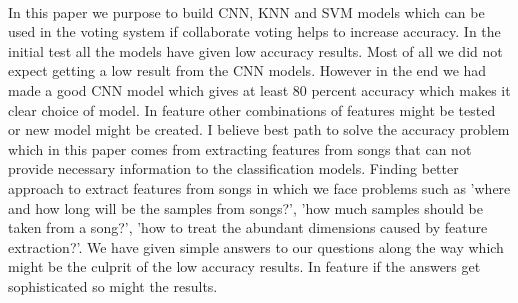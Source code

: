 \documentclass[10pt,twocolumn,letterpaper]{article}
\begin{document}
  \paragraph{}In this paper we purpose to build CNN, KNN and SVM models which can be used in the voting system if collaborate voting helps to increase accuracy. In the initial test all the models have given low accuracy results. Most of all we did not expect getting a low result from the CNN models. However in the end we had made a good CNN model which gives at least 80 percent accuracy which makes it clear choice of model. In feature other combinations of features might be tested or new model might be created. I believe best path to solve the accuracy problem which in this paper comes from extracting features from songs that can not provide necessary information to the classification models. Finding better approach to extract features from songs in which we face problems such as 'where and how long will be the samples from songs?', 'how much samples should be taken from a song?', 'how to treat the abundant dimensions caused by feature extraction?'. We have given simple answers to our questions along the way which might be the culprit of the low accuracy results. In feature if the answers get sophisticated so might the results.
  
  
  {\small
  
  
  }
  
  
\end{document}
